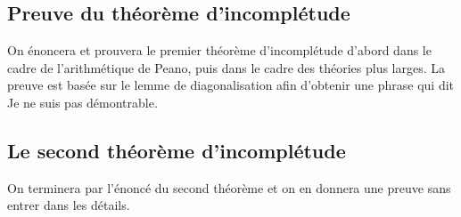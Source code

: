 \documentclass[11pt,class=report,crop=false]{standalone}
\begin{document}
\subsection{Preuve du théorème d'incomplétude}

On énoncera et prouvera le premier théorème d'incomplétude d'abord dans le cadre de l'arithmétique de Peano, puis dans le cadre des théories plus larges. La preuve est basée sur le lemme de diagonalisation afin d'obtenir une phrase qui dit \og{}Je ne suis pas démontrable\fg{}.


\subsection{Le second théorème d'incomplétude}

On terminera par l'énoncé du second théorème et on en donnera une preuve sans entrer dans les détails.


\end{document}
